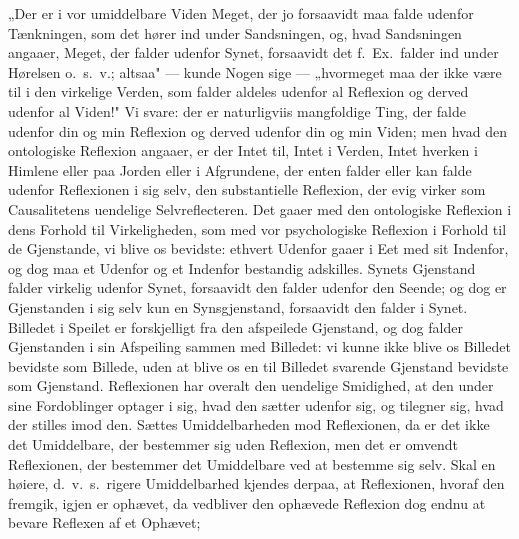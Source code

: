 \documentclass[12pt]{book}
\newcommand{\opage}[1]{\marginnote{\footnotesize\textit{[#1]}}}
\begin{document}
„Der er i vor umiddelbare Viden Meget, der jo forsaavidt maa falde udenfor Tænkningen,
som det hører ind under Sandsningen, og, hvad Sandsningen angaaer, Meget, der falder
udenfor Synet, forsaavidt det f.\ Ex.\ falder ind under Hørelsen o.\ s.\ v.; altsaa" ---
kunde Nogen sige --- „hvormeget maa der ikke være til i den virkelige Verden, som falder
aldeles udenfor al Reflexion og derved udenfor al Viden!" Vi svare: der er naturligviis
mangfoldige Ting, der falde udenfor din og min Reflexion og derved udenfor din og min
Viden; men hvad den ontologiske Reflexion angaaer, er der Intet til, Intet i Verden,
Intet hverken i Himlene eller paa Jorden eller i Afgrundene, der enten falder eller kan
falde udenfor Reflexionen i sig selv, den substantielle Reflexion, der evig virker som
Causalitetens uendelige Selvreflecteren. Det gaaer med den ontologiske Reflexion i dens
Forhold til Virkeligheden, som med vor psychologiske Reflexion i Forhold til de
Gjenstande, vi blive os bevidste: ethvert Udenfor gaaer i Eet med sit Indenfor, og dog
\opage{124} maa et Udenfor og et Indenfor bestandig adskilles. Synets Gjenstand falder virkelig
udenfor Synet, forsaavidt den falder udenfor den Seende; og dog er Gjenstanden i sig selv
kun en Synsgjenstand, forsaavidt den falder i Synet. Billedet i Speilet er forskjelligt
fra den afspeilede Gjenstand, og dog falder Gjenstanden i sin Afspeiling sammen med
Billedet: vi kunne ikke blive os Billedet bevidste som Billede, uden at blive os en til
Billedet svarende Gjenstand bevidste som Gjenstand. Reflexionen har overalt den uendelige
Smidighed, at den under sine Fordoblinger optager i sig, hvad den sætter udenfor sig, og
tilegner sig, hvad der stilles imod den. Sættes Umiddelbarheden mod Reflexionen, da er
det ikke det Umiddelbare, der bestemmer sig uden Reflexion, men det er omvendt
Reflexionen, der bestemmer det Umiddelbare ved at bestemme sig selv. Skal en høiere, d.\
v.\ s.\ rigere Umiddelbarhed kjendes derpaa, at Reflexionen, hvoraf den fremgik, igjen er
ophævet, da vedbliver den ophævede Reflexion dog endnu at bevare Reflexen af et Ophævet;
\end{document}
